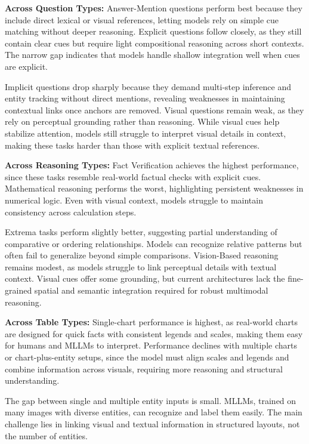 \documentclass[11pt]{article}
\begin{document}
\noindent
\textbf{Across Question Types:}
Answer-Mention questions perform best because they include direct lexical or visual references, letting models rely on simple cue matching without deeper reasoning. Explicit questions follow closely, as they still contain clear cues but require light compositional reasoning across short contexts. The narrow gap indicates that models handle shallow integration well when cues are explicit.

Implicit questions drop sharply because they demand multi-step inference and entity tracking without direct mentions, revealing weaknesses in maintaining contextual links once anchors are removed. Visual questions remain weak, as they rely on perceptual grounding rather than reasoning. While visual cues help stabilize attention, models still struggle to interpret visual details in context, making these tasks harder than those with explicit textual references.

\noindent
\textbf{Across Reasoning Types:}
Fact Verification achieves the highest performance, since these tasks resemble real-world factual checks with explicit cues. Mathematical reasoning performs the worst, highlighting persistent weaknesses in numerical logic. Even with visual context, models struggle to maintain consistency across calculation steps.

Extrema tasks perform slightly better, suggesting partial understanding of comparative or ordering relationships. Models can recognize relative patterns but often fail to generalize beyond simple comparisons. Vision-Based reasoning remains modest, as models struggle to link perceptual details with textual context. Visual cues offer some grounding, but current architectures lack the fine-grained spatial and semantic integration required for robust multimodal reasoning.

\noindent\textbf{Across Table Types:}
Single-chart performance is highest, as real-world charts are designed for quick facts with consistent legends and scales, making them easy for humans and MLLMs to interpret. Performance declines with multiple charts or chart-plus-entity setups, since the model must align scales and legends and combine information across visuals, requiring more reasoning and structural understanding.

The gap between single and multiple entity inputs is small. MLLMs, trained on many images with diverse entities, can recognize and label them easily. The main challenge lies in linking visual and textual information in structured layouts, not the number of entities.
\end{document}
